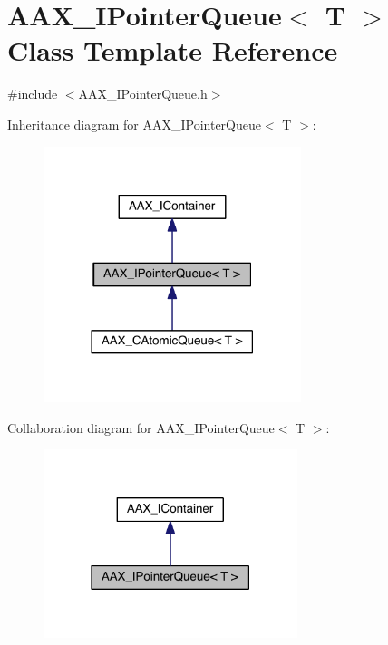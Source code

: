 \hypertarget{a00110}{}\section{A\+A\+X\+\_\+\+I\+Pointer\+Queue$<$ T $>$ Class Template Reference}
\label{a00110}


{\ttfamily \#include $<$A\+A\+X\+\_\+\+I\+Pointer\+Queue.\+h$>$}



Inheritance diagram for A\+A\+X\+\_\+\+I\+Pointer\+Queue$<$ T $>$\+:
\nopagebreak
\begin{figure}[H]
\begin{center}
\leavevmode
\includegraphics[width=213pt]{a00652}
\end{center}
\end{figure}


Collaboration diagram for A\+A\+X\+\_\+\+I\+Pointer\+Queue$<$ T $>$\+:
\nopagebreak
\begin{figure}[H]
\begin{center}
\leavevmode
\includegraphics[width=210pt]{a00653}
\end{center}
\end{figure}


